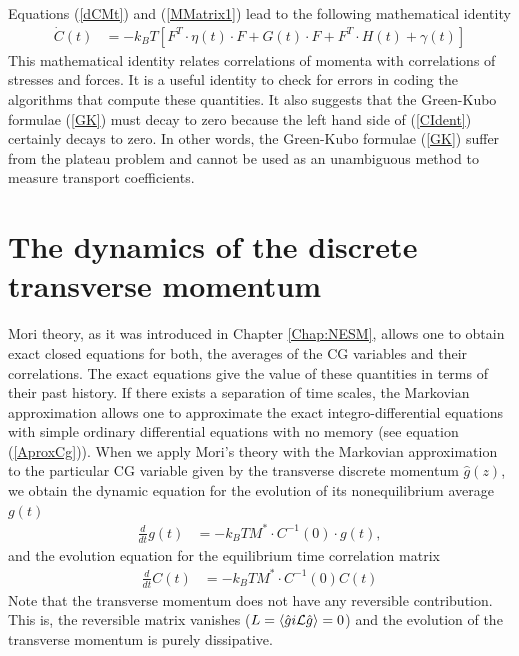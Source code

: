 \documentclass[b5paper,openright,10pt]{book}
\newcommand{\esc}{\!\cdot\!}
\newcommand{\llangle}{\left\langle}
\newcommand{\rrangle}{\right\rangle}
\begin{document}
Equations  (\ref{dCMt}) and (\ref{MMatrix1}) lead to the following mathematical identity
\begin{align}
\dot{C}(t)&=-k_BT\left[{F}^T\esc{\eta}(t)\esc{F}+{G}(t)\esc{F}+{F}^T\esc{H}(t)+{\gamma}(t)\right]
\label{CIdent}
\end{align}
This mathematical  identity relates correlations of  momenta with correlations of stresses
and forces. It is a useful identity  to check for errors in coding the
algorithms that  compute these quantities.  It also suggests  that the
Green-Kubo formulae  (\ref{GK}) must  decay to  zero because  the left
hand side of (\ref{CIdent}) certainly decays to zero.  In other words,
the Green-Kubo formulae (\ref{GK}) suffer from the plateau problem and
cannot  be  used  as  an   unambiguous  method  to  measure  transport
coefficients.


\section{The dynamics of the discrete transverse momentum}
\label{Sec:dyn}
Mori theory, as it was introduced in Chapter \ref{Chap:NESM}, allows one to obtain
exact closed equations for both, the  averages of the CG variables and
their  correlations.  The  exact  equations give  the  value of  these
quantities  in  terms  of  their  past history.   If  there  exists  a
separation of time  scales, the Markovian approximation  allows one to
approximate  the  exact  integro-differential  equations  with  simple
ordinary differential equations with no  memory (see equation (\ref{AproxCg})).  When we apply Mori's
theory with the Markovian approximation  to the particular CG variable
given by the transverse discrete  momentum $\hat{g}(z)$, we obtain the
dynamic  equation for  the  evolution of  its nonequilibrium  average
$g(t)$
\begin{align}
 \frac{d}{dt}g(t)&= -k_BT M^*\esc C^{-1}(0) \esc g(t), 
\label{InFull}
\end{align}
and the evolution equation for the equilibrium time correlation matrix
 \begin{align}
 \frac{d}{dt}C(t)&= -k_BT M^*\esc C^{-1}(0)C(t)
\label{InFull-C-2}
\end{align}
Note  that the  transverse momentum
does not  have any reversible  contribution.  This is,  the reversible
matrix  
vanishes ($L=\llangle \hat{g}  i{\cal  L}\hat{g}\rrangle=0$) and  the
evolution of the transverse momentum is purely dissipative.
\end{document}
